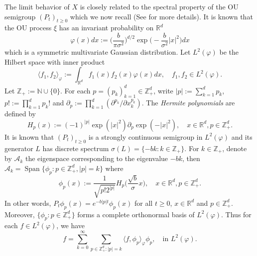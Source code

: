 \documentclass[EJP]{ejpecp} %
\begin{document}
	The limit behavior of $X$  is closely related to the spectral property of the OU semigroup $(P_t)_{t\geq 0}$ which we now recall (See \cite{MetafunePallaraPriola2002Spectrum} for more details).
	It is known that the OU process $\xi$ has an invariant probability on $\mathbb R^d$
\begin{equation}
\label{invariantdensity}
	\varphi(x)dx
	:=\Big (\frac{b}{\pi \sigma^2}\Big )^{d/2}\exp \Big(-\frac{b}{\sigma^2}|x|^2 \Big)dx
\end{equation}
	which is a   symmetric multivariate Gaussian distribution.
	Let $L^2(\varphi)$ be the Hilbert space with inner product
\[ 
  	\langle f_1, f_2 \rangle_{\varphi}
  	:= \int_{\mathbb R^d}f_1(x)f_2(x)\varphi(x) dx, \quad f_1,f_2 \in L^2(\varphi).
\]
	Let $\mathbb Z_+ := \mathbb N\cup\{0\}$.
	For each $p = (p_k)_{k = 1}^d \in \mathbb{Z}_+^{d}$, write $|p|:=\sum_{k=1}^d p_k$, $p!:= \prod_{k= 1}^d p_k!$ and $\partial_p:= \prod_{k = 1}^d(\partial^{p_k}/\partial x_k^{p_k})$.
	The \emph{Hermite polynomials} are defined by
\[
	H_p(x)
	:=(-1)^{|p|}\exp(|x|^2) \partial_p \exp(-|x|^2), 
	\quad x\in \mathbb R^d, p \in \mathbb{Z}_+^{d}.
\]
	It is known that $(P_t)_{t\geq 0}$ is a strongly continuous semigroup in $L^2(\varphi)$ and its generator $L$ has discrete spectrum $\sigma(L)= \{-bk: k \in \mathbb Z_+\}$.
	For $k \in \mathbb Z_+$, denote by $\mathcal{A}_k$ the eigenspace corresponding to the eigenvalue $-bk$, then $ \mathcal{A}_k = \operatorname{Span} \{\phi_p : p\in \mathbb Z_+^d, |p|=k\}$ where
\begin{equation}
\label{eigenfunction}
	\phi_p(x)
  	:= \frac{1}{\sqrt{ p! 2^{|p|} }} H_p \Big(\frac{ \sqrt{b} }{\sigma}x \Big), 
  	\quad x\in \mathbb R^d, p\in \mathbb Z_+^d.
\end{equation}
	In other words,
\(
  	P_t\phi_p(x)
  	= e^{-b|p|t}\phi_p(x)
\)
	for all $t\geq 0$, $x\in \mathbb R^d$ and $p\in \mathbb Z_+^d$.
	Moreover, $\{\phi_p: p \in \mathbb Z_+^d\}$ forms a complete orthonormal basis of $L^2(\varphi)$.
	Thus for each $f\in L^2(\varphi)$, we have
\begin{equation}
\label{semicomp1}
  	f
  	= \sum_{k=0}^{\infty}\sum_{p\in \mathbb Z_+^d:|p|=k}\langle f, \phi_p \rangle_{\varphi} \phi_p, 
  	\quad \text{in~} L^2(\varphi).
\end{equation}
\end{document}

